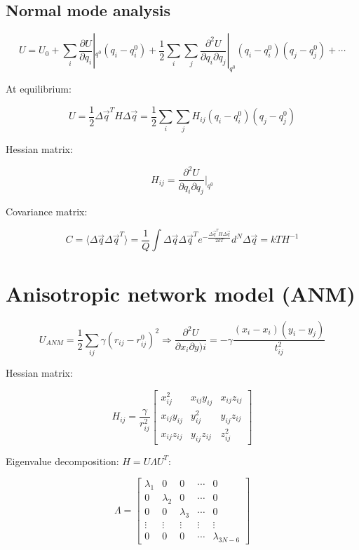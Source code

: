 	\subsection{Normal mode analysis}

	$$U = U_0 + \sum\limits_i\frac{\partial U}{\partial q_i}|_{q^0}(q_i-q_i^0) + \frac{1}{2}\sum\limits_i\sum\limits_j\frac{\partial^2 U}{\partial q_i\partial q_j}|_{q^0}(q_i-q_i^0)(q_j-q_j^0) + \cdots$$

	At equilibrium:

	$$U = \frac{1}{2}\Delta\vec{q}^TH\Delta\vec{q} = \frac{1}{2}\sum\limits_i\sum\limits_j H_{ij}(q_i-q_i^0)(q_j-q_j^0)$$

	Hessian matrix:

	$$H_{ij} = \frac{\partial^2 U}{\partial q_i\partial q_j}|_{q^0}$$

	Covariance matrix:

	$$C = \langle\Delta\vec{q}\Delta\vec{q}^T\rangle = \frac{1}{Q}\int\Delta\vec{q}\Delta\vec{q}^Te^{-\frac{\Delta\vec{q}^TH\Delta\vec{q}}{2kT}}d^N\Delta\vec{q} = kTH^{-1}$$

\section{Anisotropic network model (ANM)}

$$U_{ANM} = \frac{1}{2}\sum\limits_{ij}\gamma(r_{ij}-r_{ij}^0)^2\Rightarrow\frac{\partial^2 U}{\partial x_i\partial y)i} = -\gamma\frac{(x_i-x_i)(y_i-y_j)}{t_{ij}^2}$$

Hessian matrix:

$$H_{ij} = \frac{\gamma}{r_{ij}^2}\begin{bmatrix}x_{ij}^2 & x_{ij}y_{ij} & x_{ij}z_{ij}\\x_{ij}y_{ij} & y_{ij}^2 & y_{ij}z_{ij}\\ x_{ij}z_{ij} & y_{ij}z_{ij} & z_{ij}^2\end{bmatrix}$$

Eigenvalue decomposition: $H=U\Lambda U^T$:

$$\Lambda = \begin{bmatrix}\lambda_1 & 0 & 0 & \cdots & 0\\ 0 & \lambda_2 & 0 & \cdots & 0\\ 0 & 0 & \lambda_3 & \cdots & 0\\\vdots & \vdots & \vdots & \vdots & \vdots\\ 0 & 0 & 0 & \cdots & \lambda_{3N-6}\end{bmatrix}$$

